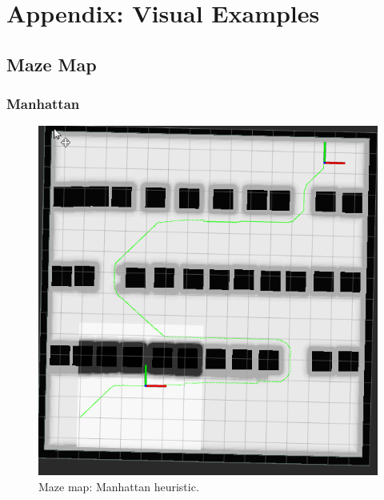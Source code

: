 \documentclass{article}
\begin{document}
\section*{Appendix: Visual Examples}\label{sec:appendix_images}

\subsection*{Maze Map}

\subsubsection*{Manhattan}
\begin{figure}[!ht]
    \centering
    \includegraphics[width=0.9\columnwidth]{../images/manhattan_maze_corridor.png}
    \caption{Maze map: Manhattan heuristic.}
    \label{fig:manhattan_maze}
\end{figure}
\clearpage
\end{document}
